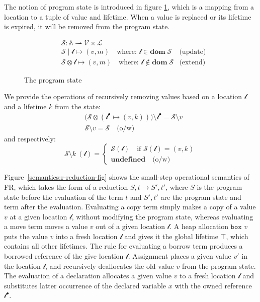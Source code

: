 The notion of program state is introduced in figure \ref{semantics:program-state-fig}, which is a mapping from a location to a tuple of value and lifetime. When a value is replaced or its lifetime is expired, it will be removed from the program state.
\begin{figure}[b]
\begin{align*}
    &\mathcal{S}: \mathbb{A} \rightharpoonup \mathcal{V} \times \mathcal{L}\\
    &\mathcal{S} \mid \mathscr{l} \mapsto (v, m) \quad \text{where: } \mathscr{l} \in \textbf{dom}\;\mathcal{S} &\text{(update)}\\
    &\mathcal{S} \otimes \mathscr{l} \mapsto (v, m) \quad \text{where: } \mathscr{l} \notin \textbf{dom}\;\mathcal{S} &\text{(extend)}
\end{align*}
\label{semantics:program-state-fig}
\caption{The program state }
\end{figure}
We provide the operations of recursively removing values based on a location $\mathscr{l}$ and a lifetime $k$ from the state: 
\begin{align*}
      &\bigl(\mathcal{S}\otimes(\mathscr{l}^\bullet \mapsto (v, k))\bigr)\setminus {\mathscr{l}^\bullet} = \mathcal{S}\setminus v \\
      &\mathcal{S}\setminus v = \mathcal{S} \quad\text{(o/w)}
\end{align*}
and respectively:
\[
   \mathcal{S}\setminus k \ (\mathscr{l}) =
    \begin{cases}
      \mathcal{S}(\mathscr{l}) \quad\text{if $\mathcal{S}(\mathscr{l})=(v,k)$} \\
      \textbf{undefined}\quad\text{(o/w)}
    \end{cases}
\] %

Figure~\ref{semantics:r-reduction-fig} shows the small-step operational semantics of FR, which takes the form of a reduction $S, t \longrightarrow S', t'$, where $S$ is the program state before the evaluation of the term $t$ and $S', t'$ are the program state and term after the evaluation.
Evaluating a copy term simply makes a copy of a value $v$ at a given location $\mathscr{l}$, without modifying the program state, whereas evaluating a move term moves a value $v$ out of a given location $\mathscr{l}$.
A heap allocation $\texttt{box }v$ puts the value $v$ into a fresh location $\mathscr{l}$ and gives it the global lifetime $\top$, which contains all other lifetimes. The rule for evaluating a borrow term produces a borrowed reference of the give location $\mathscr{l}$.
Assignment places a given value $v'$ in the location $\mathscr{l}$, and recursively deallocates the old value $v$ from the program state.
The evaluation of a declaration allocates a given value $v$ to a fresh location $\mathscr{l}$ and substitutes latter occurrence of the declared variable $x$ with the owned reference $\mathscr{l}^\bullet$.

